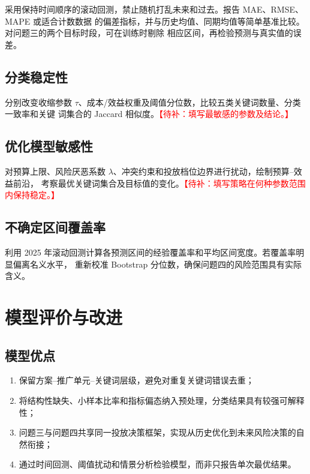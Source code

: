 \documentclass[UTF8,a4paper,zihao=-4]{ctexart}
\newcommand{\placeholder}[1]{\textcolor{red}{【待补：#1】}}
\begin{document}
采用保持时间顺序的滚动回测，禁止随机打乱未来和过去。报告 MAE、RMSE、MAPE 或适合计数数据
的偏差指标，并与历史均值、同期均值等简单基准比较。对问题三的两个目标时段，可在训练时剔除
相应区间，再检验预测与真实值的误差。

\subsection{分类稳定性}

分别改变收缩参数 $\tau$、成本/效益权重及阈值分位数，比较五类关键词数量、分类一致率和关键
词集合的 Jaccard 相似度。\placeholder{填写最敏感的参数及结论。}

\subsection{优化模型敏感性}

对预算上限、风险厌恶系数 $\lambda$、冲突约束和投放档位边界进行扰动，绘制预算--效益前沿，
考察最优关键词集合及目标值的变化。\placeholder{填写策略在何种参数范围内保持稳定。}

\subsection{不确定区间覆盖率}

利用 2025 年滚动回测计算各预测区间的经验覆盖率和平均区间宽度。若覆盖率明显偏离名义水平，
重新校准 Bootstrap 分位数，确保问题四的风险范围具有实际含义。

\section{模型评价与改进}

\subsection{模型优点}

\begin{enumerate}
  \item 保留方案--推广单元--关键词层级，避免对重复关键词错误去重；
  \item 将结构性缺失、小样本比率和指标偏态纳入预处理，分类结果具有较强可解释性；
  \item 问题三与问题四共享同一投放决策框架，实现从历史优化到未来风险决策的自然衔接；
  \item 通过时间回测、阈值扰动和情景分析检验模型，而非只报告单次最优结果。
\end{enumerate}
\end{document}
